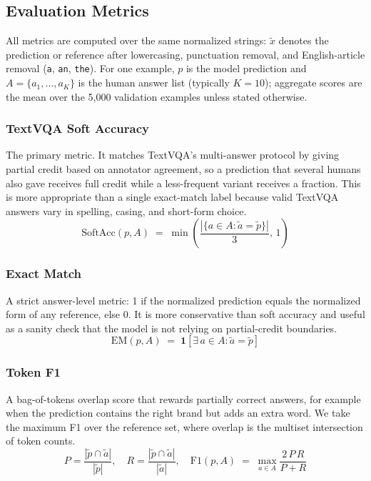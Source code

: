 \documentclass[11pt]{article}
\begin{document}
\subsection{Evaluation Metrics}

All metrics are computed over the same normalized strings: $\tilde{x}$ denotes the prediction or reference after lowercasing, punctuation removal, and English-article removal (\texttt{a}, \texttt{an}, \texttt{the}). For one example, $p$ is the model prediction and $A=\{a_1,\ldots,a_K\}$ is the human answer list (typically $K=10$); aggregate scores are the mean over the 5{,}000 validation examples unless stated otherwise.

\subsubsection{TextVQA Soft Accuracy}

The primary metric. It matches TextVQA's multi-answer protocol by giving partial credit based on annotator agreement, so a prediction that several humans also gave receives full credit while a less-frequent variant receives a fraction. This is more appropriate than a single exact-match label because valid TextVQA answers vary in spelling, casing, and short-form choice.
\[
\mathrm{SoftAcc}(p, A) \;=\; \min\!\left(\frac{|\{a \in A : \tilde{a} = \tilde{p}\}|}{3},\, 1\right)
\]

\subsubsection{Exact Match}

A strict answer-level metric: 1 if the normalized prediction equals the normalized form of any reference, else 0. It is more conservative than soft accuracy and useful as a sanity check that the model is not relying on partial-credit boundaries.
\[
\mathrm{EM}(p, A) \;=\; \mathbf{1}\!\left[\exists\, a \in A : \tilde{a} = \tilde{p}\right]
\]

\subsubsection{Token F1}

A bag-of-tokens overlap score that rewards partially correct answers, for example when the prediction contains the right brand but adds an extra word. We take the maximum F1 over the reference set, where overlap is the multiset intersection of token counts.
\[
P = \frac{|\tilde{p} \cap \tilde{a}|}{|\tilde{p}|},\quad R = \frac{|\tilde{p} \cap \tilde{a}|}{|\tilde{a}|},\quad
\mathrm{F1}(p, A) \;=\; \max_{a \in A} \frac{2\,P\,R}{P + R}
\]
\end{document}
